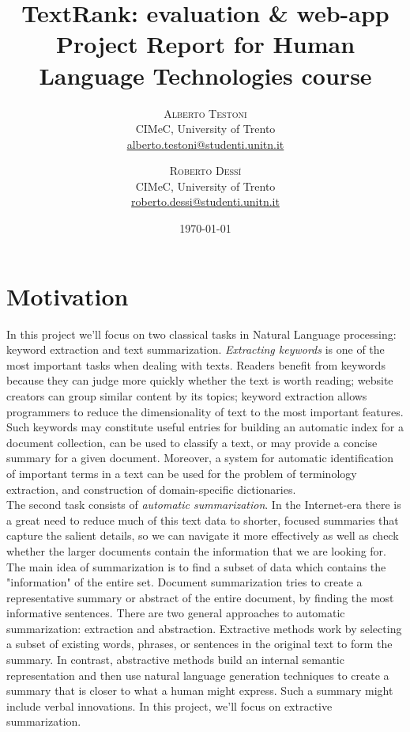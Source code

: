 \documentclass[twoside,twocolumn]{article}
\title{TextRank: evaluation \& web-app \\
\large Project Report for Human Language Technologies course } %
\author{%
	\textsc{Alberto Testoni }\\ [1ex]%
\normalsize CIMeC, University of Trento \\ %
\normalsize \href{mailto:alberto.testoni@studenti.unitn.it}{alberto.testoni@studenti.unitn.it} %
\and %
\textsc{Roberto Dess\'{i} } \\[1ex] %
\normalsize  CIMeC, University of Trento\\ %
\normalsize \href{mailto:roberto.dessi@studenti.unitn.it}{roberto.dessi@studenti.unitn.it} %
}
\date{\today} %
\begin{document}
\maketitle


\section{Motivation}
In this project we'll focus on two classical tasks in Natural Language processing: keyword extraction and text summarization. \textit{Extracting keywords} is one of the most important tasks when dealing with texts. Readers benefit from keywords because they can judge more quickly whether the text is worth reading; website creators can group similar content by its topics; keyword extraction allows programmers to reduce the dimensionality of text to the most important features. Such keywords may constitute useful entries for building an automatic index for a document collection, can be used to classify a text, or may provide a concise summary for a given document. Moreover, a system for automatic identification of important terms in a text can be used for the problem of terminology extraction, and construction of domain-specific dictionaries.\\
The second task consists of \textit{automatic summarization}. In the Internet-era there is a great need to reduce much of this text data to shorter, focused summaries that capture the salient details, so we can navigate it more effectively as well as check whether the larger documents contain the information that we are looking for. The main idea of summarization is to find a subset of data which contains the "information" of the entire set. Document summarization tries to create a representative summary or abstract of the entire document, by finding the most informative sentences. There are two general approaches to automatic summarization: extraction and abstraction. Extractive methods work by selecting a subset of existing words, phrases, or sentences in the original text to form the summary. In contrast, abstractive methods build an internal semantic representation and then use natural language generation techniques to create a summary that is closer to what a human might express. Such a summary might include verbal innovations. In this project, we'll focus on extractive summarization. 
\end{document}
